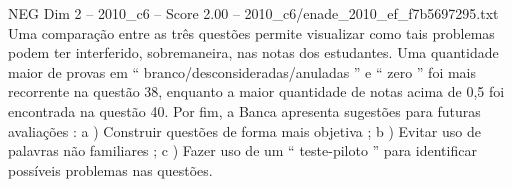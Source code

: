 \begin{textsample}{NEG Dim 2 – 2010\_c6 – Score 2.00 – 2010\_c6/enade\_2010\_ef\_f7b5697295.txt}
Uma comparação entre as três questões permite visualizar como tais problemas podem ter interferido, sobremaneira, nas notas dos estudantes.
Uma quantidade maior de provas em “ branco/desconsideradas/anuladas ” e “ zero ” foi mais recorrente na questão 38, enquanto a maior quantidade de notas acima de 0,5 foi encontrada na questão 40.
Por fim, a Banca apresenta sugestões para futuras avaliações : a ) Construir questões de forma mais objetiva ; b ) Evitar uso de palavras não familiares ; c ) Fazer uso de um “ teste-piloto ” para identificar possíveis problemas nas questões.

\end{textsample}
